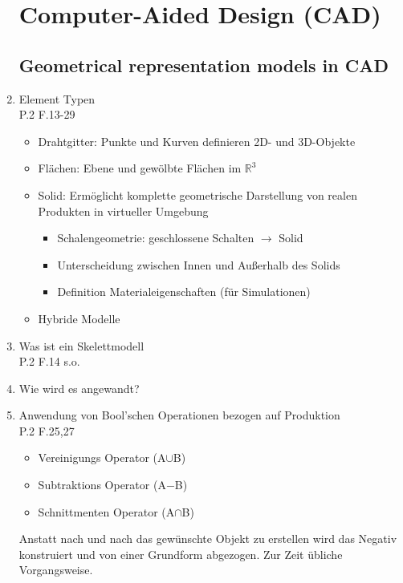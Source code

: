 \documentclass[10pt,a4paper,fleqn]{article}
\begin{document}
\begin{enumerate}
\section{Computer-Aided Design (CAD)}
\subsection{Geometrical representation models in CAD}
	\item Element Typen\\
		P.2 F.13-29
	 	\begin{itemize}
	 		\item Drahtgitter: Punkte und Kurven definieren 2D- und 3D-Objekte
	 		\item Flächen: Ebene und gewölbte Flächen im $\mathbb{R}^3$
	 		\item Solid: Ermöglicht komplette geometrische Darstellung von realen Produkten in virtueller Umgebung
	 			\begin{itemize}
	 				\item Schalengeometrie: geschlossene Schalten $\rightarrow$ Solid
	 				\item Unterscheidung zwischen Innen und Außerhalb des Solids
	 				\item Definition Materialeigenschaften (für Simulationen)	 			
	 			\end{itemize}
	 		\item Hybride Modelle
	 	\end{itemize}
	 \item Was ist ein Skelettmodell\\
	 	P.2 F.14
	 	s.o.
	 \item Wie wird es angewandt?
	 \item Anwendung von Bool'schen Operationen bezogen auf Produktion\\
	 	P.2 F.25,27
	 	\begin{itemize}
	 		\item Vereinigungs Operator (A$\cup$B)
	 		\item Subtraktions Operator (A$ - $B)
	 		\item Schnittmenten Operator (A$\cap$B)
	 	\end{itemize}
	 	Anstatt nach und nach das gewünschte Objekt zu erstellen wird das Negativ konstruiert und von einer Grundform abgezogen. Zur Zeit übliche Vorgangsweise.
	

\end{enumerate}
\end{document}
